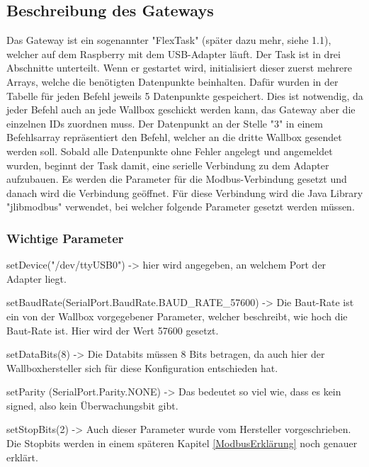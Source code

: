 \subsection{Beschreibung des Gateways} 
Das Gateway ist ein sogenannter "FlexTask" (später dazu mehr, siehe 1.1), welcher auf dem Raspberry mit dem USB-Adapter läuft. Der Task ist in drei Abschnitte unterteilt. Wenn er gestartet wird, initialisiert dieser zuerst mehrere Arrays, welche die benötigten Datenpunkte beinhalten. Dafür wurden in der Tabelle für jeden Befehl jeweils 5 Datenpunkte gespeichert. Dies ist notwendig, da jeder Befehl auch an jede Wallbox geschickt werden kann, das Gateway aber die einzelnen IDs zuordnen muss. Der Datenpunkt an der Stelle "3" in einem Befehlsarray repräsentiert den Befehl, welcher an die dritte Wallbox gesendet werden soll.  
Sobald alle Datenpunkte ohne Fehler angelegt und angemeldet wurden, beginnt der Task damit, eine serielle Verbindung zu dem Adapter aufzubauen. Es werden die Parameter für die Modbus-Verbindung gesetzt und danach wird die Verbindung geöffnet. Für diese Verbindung wird die Java Library "jlibmodbus" verwendet, bei welcher folgende Parameter gesetzt werden müssen. 

\subsubsection*{Wichtige Parameter} 


\begin{compactitem}
  \item setDevice("/dev/ttyUSB0") -> hier wird angegeben, an welchem Port der Adapter liegt.  
  \item setBaudRate(SerialPort.BaudRate.BAUD\_RATE\_57600) -> Die Baut-Rate ist ein von der Wallbox vorgegebener Parameter, welcher beschreibt, wie hoch die Baut-Rate ist. Hier wird der Wert 57600 gesetzt.  
  \item setDataBits(8) -> Die Databits müssen 8 Bits betragen, da auch hier der Wallboxhersteller sich für diese Konfiguration entschieden hat.  
  \item setParity (SerialPort.Parity.NONE) -> Das bedeutet so viel wie, dass es kein signed, also kein Überwachungsbit gibt. 
  \item setStopBits(2) -> Auch dieser Parameter wurde vom Hersteller vorgeschrieben. Die Stopbits werden in einem späteren Kapitel \ref{ModbusErklärung} noch genauer erklärt. 
\end{compactitem}

